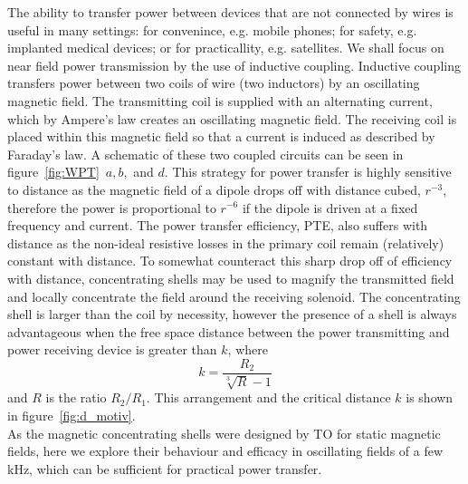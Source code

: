\documentclass[11pt]{iopart}
\begin{document}
The ability to transfer power between devices that are not connected
by wires is useful in many settings: for convenince, e.g. mobile
phones; for safety, e.g. implanted medical devices; or for
practicallity, e.g. satellites. We shall focus on near field power
transmission by the use of inductive coupling. Inductive coupling
transfers power between two coils of wire (two inductors) by an
oscillating magnetic field.  The transmitting coil is supplied with an
alternating current, which by Ampere's law creates an oscillating
magnetic field. The receiving coil is placed within this magnetic
field so that a current is induced as described by Faraday's law. A
schematic of these two coupled circuits can be seen in
figure~\ref{fig:WPT}~$a, b,$ and $d$. This strategy for power transfer
is highly sensitive to distance as the magnetic field of a dipole
drops off with distance cubed, $r^{-3}$, therefore the power is
proportional to $r^{-6}$ if the dipole is driven at a fixed frequency
and current.  The power transfer efficiency, PTE, also suffers with
distance as the non-ideal resistive losses in the primary coil remain
(relatively) constant with distance. To somewhat counteract this sharp
drop off of efficiency with distance, concentrating shells may be used
to magnify the transmitted field and locally concentrate the field
around the receiving solenoid. The concentrating shell is larger than
the coil by necessity, however the presence of a shell is always
advantageous when the free space distance between the power
transmitting and power receiving device is greater than $k$,\cite{Prat2016} where
\begin{equation}
k = \frac{R_2}{\sqrt[3]{R}-1}
\end{equation}
and $R$ is the ratio $R_2/R_1$. This arrangement and the critical
distance $k$ is shown in figure~\ref{fig:d_motiv}.\\
As the magnetic concentrating shells were designed by TO for static
magnetic fields, here we explore their behaviour and efficacy in
oscillating fields of a few kHz, which can be sufficient for practical
power transfer\cite{Wang2005}.\\



\end{document}
